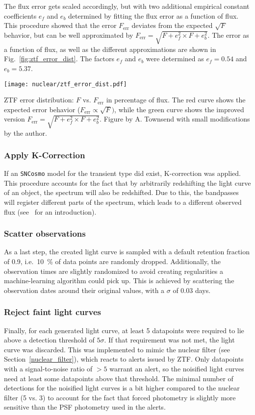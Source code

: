 The flux error gets scaled accordingly, but with two additional empirical constant coefficients $e_f$ and $e_b$ determined by fitting the flux error as a function of flux. This procedure showed that the error $F_\text{err}$ deviates from the expected $\sqrt{F}$ behavior, but can be well approximated by $F_\text{err} = \sqrt{F + e_f^2\times F + e_b^2}$. The error as a function of flux, as well as the different approximations are shown in Fig.~\ref{fig:ztf_error_dist}. The factors $e_f$ and $e_b$ were determined as $e_f = 0.54$ and $e_b = 5.37$.

\begin{marginfigure}
  \texttt{[image: nuclear/ztf\_error\_dist.pdf]}
  \caption[ZTF error distribution]{ZTF error distribution: $F$ vs. $F_\text{err}$ in percentage of flux. The red curve shows the expected error behavior ($F_\text{err}\propto \sqrt{F})$, while the green curve shows the improved version $F_\text{err} = \sqrt{F + e_f^2\times F + e_b^2}$. Figure by A. Townsend with small modifications by the author.}
\end{marginfigure}

\subsubsection{Apply K-Correction}
If an \texttt{SNCosmo} model for the transient type did exist, K-correction was applied. This procedure accounts for the fact that by arbitrarily redshifting the light curve of an object, the spectrum will also be redshifted. Due to this, the bandpasses will register different parts of the spectrum, which leads to a different observed flux (see~ for an introduction).

\subsubsection{Scatter observations}
As a last step, the created light curve is sampled with a default retention fraction of 0.9, i.e.~\SI{10}{\percent} of data points are randomly dropped. Additionally, the observation times are slightly randomized to avoid creating regularities a machine-learning algorithm could pick up. This is achieved by scattering the observation dates around their original values, with a $\sigma$ of $0.03$ days.

\subsubsection{Reject faint light curves}
Finally, for each generated light curve, at least 5 datapoints were required to lie above a detection threshold of $5 \sigma$. If that requirement was not met, the light curve was discarded. This was implemented to mimic the nuclear filter (see Section~\ref{nuclear_filter}), which reacts to alerts issued by ZTF. Only datapoints with a signal-to-noise ratio of $>5$ warrant an alert, so the noisified light curves need at least some datapoints above that threshold. The minimal number of detections for the noisified light curves is a bit higher compared to the nuclear filter (5 vs. 3) to account for the fact that forced photometry is slightly more sensitive than the PSF photometry used in the alerts.

